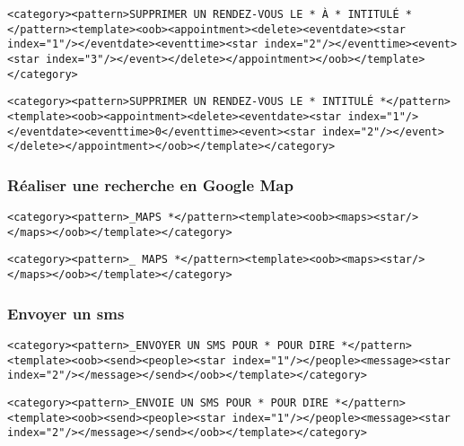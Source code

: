 \begin{lstlisting}[frame=none,aboveskip=0.5em]
<category><pattern>SUPPRIMER UN RENDEZ-VOUS LE * À * INTITULÉ *</pattern><template><oob><appointment><delete><eventdate><star index="1"/></eventdate><eventtime><star index="2"/></eventtime><event><star index="3"/></event></delete></appointment></oob></template></category>
\end{lstlisting}

\begin{lstlisting}[frame=none,aboveskip=0.5em]
<category><pattern>SUPPRIMER UN RENDEZ-VOUS LE * INTITULÉ *</pattern><template><oob><appointment><delete><eventdate><star index="1"/></eventdate><eventtime>0</eventtime><event><star index="2"/></event></delete></appointment></oob></template></category>
\end{lstlisting}

\subsubsection{Réaliser une recherche en Google Map}
\begin{lstlisting}[frame=none,aboveskip=0.5em]
<category><pattern>_MAPS *</pattern><template><oob><maps><star/></maps></oob></template></category>
\end{lstlisting}

\begin{lstlisting}[frame=none,aboveskip=0.5em]
<category><pattern>_ MAPS *</pattern><template><oob><maps><star/></maps></oob></template></category>
\end{lstlisting}

\subsubsection{Envoyer un sms}
\begin{lstlisting}[frame=none,aboveskip=0.5em]
<category><pattern>_ENVOYER UN SMS POUR * POUR DIRE *</pattern><template><oob><send><people><star index="1"/></people><message><star index="2"/></message></send></oob></template></category>
\end{lstlisting}

\begin{lstlisting}[frame=none,aboveskip=0.5em,belowskip=1.5em]
<category><pattern>_ENVOIE UN SMS POUR * POUR DIRE *</pattern><template><oob><send><people><star index="1"/></people><message><star index="2"/></message></send></oob></template></category>
\end{lstlisting}



